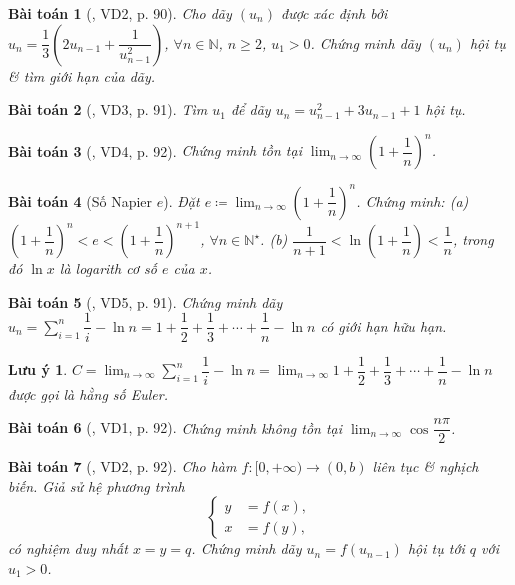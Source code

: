 \documentclass[oneside]{book}
\newtheorem{baitoan}{Bài toán}
\newtheorem{luuy}{Lưu ý}
\begin{document}
\begin{baitoan}[\cite{Hung_nang_cao_phat_trien_Toan_11_tap_1}, VD2, p. 90]
	Cho dãy $(u_n)$ được xác định bởi $u_n = \dfrac{1}{3}\left(2u_{n-1} + \dfrac{1}{u_{n-1}^2}\right)$, $\forall n\in\mathbb{N}$, $n\ge2$, $u_1 > 0$. Chứng minh dãy $(u_n)$ hội tụ \& tìm giới hạn của dãy.
\end{baitoan}

\begin{baitoan}[\cite{Hung_nang_cao_phat_trien_Toan_11_tap_1}, VD3, p. 91]
	Tìm $u_1$ để dãy $u_n = u_{n-1}^2 + 3u_{n-1} + 1$ hội tụ.
\end{baitoan}

\begin{baitoan}[\cite{Hung_nang_cao_phat_trien_Toan_11_tap_1}, VD4, p. 92]
	Chứng minh tồn tại $\lim_{n\to\infty} \left(1 + \dfrac{1}{n}\right)^n$.
\end{baitoan}

\begin{baitoan}[Số Napier $e$]
	Đặt $e\coloneqq\lim_{n\to\infty} \left(1 + \dfrac{1}{n}\right)^n$. Chứng minh: (a) $ \left(1 + \dfrac{1}{n}\right)^n < e < \left(1 + \dfrac{1}{n}\right)^{n+1}$, $\forall n\in\mathbb{N}^\star$. (b) $\dfrac{1}{n + 1} < \ln\left(1 + \dfrac{1}{n}\right) < \dfrac{1}{n}$, trong đó $\ln x$ là logarith cơ số $e$ của $x$.
\end{baitoan}

\begin{baitoan}[\cite{Hung_nang_cao_phat_trien_Toan_11_tap_1}, VD5, p. 91]
	Chứng minh dãy $u_n = \sum_{i=1}^n \dfrac{1}{i} - \ln n = 1 + \dfrac{1}{2} + \dfrac{1}{3} + \cdots + \dfrac{1}{n} - \ln n$ có giới hạn hữu hạn.
\end{baitoan}

\begin{luuy}
	$C = \lim_{n\to\infty} \sum_{i=1}^n \dfrac{1}{i} - \ln n = \lim_{n\to\infty}  1 + \dfrac{1}{2} + \dfrac{1}{3} + \cdots + \dfrac{1}{n} - \ln n$ được gọi là {\rm hằng số Euler}.
\end{luuy}

\begin{baitoan}[\cite{Hung_nang_cao_phat_trien_Toan_11_tap_1}, VD1, p. 92]
	Chứng minh không tồn tại $\lim_{n\to\infty} \cos\dfrac{n\pi}{2}$.
\end{baitoan}

\begin{baitoan}[\cite{Hung_nang_cao_phat_trien_Toan_11_tap_1}, VD2, p. 92]
	Cho hàm $f:[0,+\infty)\to(0,b)$ liên tục \& nghịch biến. Giả sử hệ phương trình
	\begin{equation*}
		\left\{\begin{split}
			y &= f(x),\\
			x &= f(y),
		\end{split}\right.
	\end{equation*}
	có nghiệm duy nhất $x = y = q$. Chứng minh dãy $u_n = f(u_{n-1})$ hội tụ tới $q$ với $u_1 > 0$.
\end{baitoan}
\end{document}
